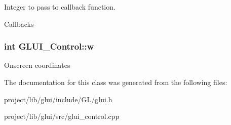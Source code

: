 Integer to pass to callback function. 

Callbacks \hypertarget{classGLUI__Control_aca82a099b9cbbadb188794cbfb06aa27}{
\subsubsection[{w}]{\setlength{\rightskip}{0pt plus 5cm}int G\-L\-U\-I\-\_\-\-Control\-::w}}\label{classGLUI__Control_aca82a099b9cbbadb188794cbfb06aa27}
Onscreen coordinates 

The documentation for this class was generated from the following files\-:\begin{DoxyCompactItemize}
\item 
project/lib/glui/include/\-G\-L/glui.\-h\item 
project/lib/glui/src/glui\-\_\-control.\-cpp\end{DoxyCompactItemize}

